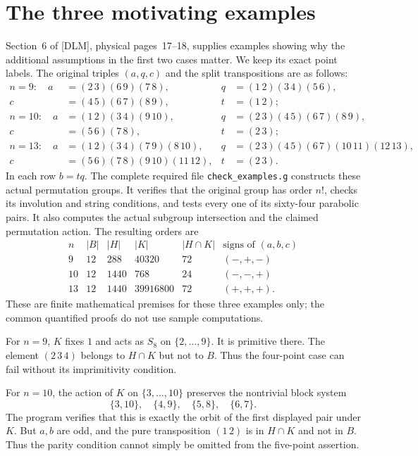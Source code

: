 \documentclass[a4paper,11pt]{article}
\begin{document}
\section{The three motivating examples}
Section~6 of [DLM], physical pages~17--18, supplies examples showing
why the additional assumptions in the first two cases matter. We keep
its exact point labels. The original triples $(a,q,c)$ and the split
transpositions are as follows:
\begin{align*}
n=9:\quad
 a&=(2\,3)(6\,9)(7\,8),&
 q&=(1\,2)(3\,4)(5\,6),\\
 c&=(4\,5)(6\,7)(8\,9),&t&=(1\,2);\\[2pt]
n=10:\quad
 a&=(1\,2)(3\,4)(9\,10),&
 q&=(2\,3)(4\,5)(6\,7)(8\,9),\\
 c&=(5\,6)(7\,8),&t&=(2\,3);\\[2pt]
n=13:\quad
 a&=(1\,2)(3\,4)(7\,9)(8\,10),&
 q&=(2\,3)(4\,5)(6\,7)(10\,11)(12\,13),\\
 c&=(5\,6)(7\,8)(9\,10)(11\,12),&t&=(2\,3).
\end{align*}
In each row $b=tq$. The complete required file \texttt{check\_examples.g}
constructs these actual permutation groups. It verifies that the original
group has order $n!$, checks its involution and string conditions, and
tests every one of its sixty-four parabolic pairs. It also computes the
actual subgroup intersection and the claimed permutation action. The
resulting orders are
\[
\begin{array}{c|rrrr|c}
 n&|B|&|H|&|K|&|H\cap K|&\text{signs of }(a,b,c)\\\hline
9&12&288&40320&72&(-,+,-)\\
10&12&1440&768&24&(-,-,+)\\
13&12&1440&39916800&72&(+,+,+).
\end{array}
\]
These are finite mathematical premises for these three examples only;
the common quantified proofs do not use sample computations.

For $n=9$, $K$ fixes $1$ and acts as $S_8$ on $\{2,\ldots,9\}$.
It is primitive there. The element $(2\,3\,4)$ belongs to $H\cap K$
but not to $B$. Thus the four-point case can fail without its
imprimitivity condition.

For $n=10$, the action of $K$ on $\{3,\ldots,10\}$ preserves the
nontrivial block system
\[
 \{3,10\},\quad\{4,9\},\quad\{5,8\},\quad\{6,7\}.
\]
The program verifies that this is exactly the orbit of the first displayed
pair under $K$. But $a,b$ are odd, and the pure transposition $(1\,2)$
is in $H\cap K$ and not in $B$. Thus the parity condition cannot simply
be omitted from the five-point assertion.
\end{document}
